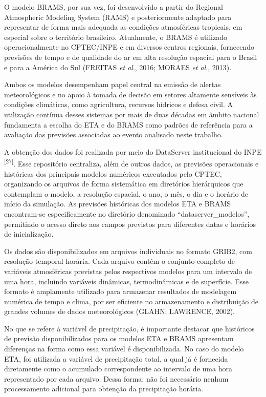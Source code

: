 \documentclass[12pt,a4paper,oneside]{book}
\begin{document}
O modelo BRAMS, por sua vez, foi desenvolvido a partir do Regional Atmospheric Modeling System (RAMS) e posteriormente adaptado para representar de forma mais adequada as condições atmosféricas tropicais, em especial sobre o território brasileiro. Atualmente, o BRAMS é utilizado operacionalmente no CPTEC/INPE e em diversos centros regionais, fornecendo previsões de tempo e de qualidade do ar em alta resolução espacial para o Brasil e para a América do Sul (FREITAS \emph{et al}., 2016; MORAES \emph{et al}., 2013).

Ambos os modelos desempenham papel central na emissão de alertas meteorológicos e no apoio à tomada de decisão em setores altamente sensíveis às condições climáticas, como agricultura, recursos hídricos e defesa civil. A utilização contínua desses sistemas por mais de duas décadas em âmbito nacional fundamenta a escolha do ETA e do BRAMS como padrões de referência para a avaliação das previsões associadas ao evento analisado neste trabalho.

A obtenção dos dados foi realizada por meio do DataServer institucional do INPE \textsuperscript{{[}27{]}}. Esse repositório centraliza, além de outros dados, as previsões operacionais e históricas dos principais modelos numéricos executados pelo CPTEC, organizando os arquivos de forma sistemática em diretórios hierárquicos que contemplam o modelo, a resolução espacial, o ano, o mês, o dia e o horário de início da simulação. As previsões históricas dos modelos ETA e BRAMS encontram-se especificamente no diretório denominado ``dataserver\_modelos'', permitindo o acesso direto aos campos previstos para diferentes datas e horários de inicialização.

Os dados são disponibilizados em arquivos individuais no formato GRIB2, com resolução temporal horária. Cada arquivo contém o conjunto completo de variáveis atmosféricas previstas pelos respectivos modelos para um intervalo de uma hora, incluindo variáveis dinâmicas, termodinâmicas e de superfície. Esse formato é amplamente utilizado para armazenar resultados de modelagem numérica de tempo e clima, por ser eficiente no armazenamento e distribuição de grandes volumes de dados meteorológicos (GLAHN; LAWRENCE, 2002).

No que se refere à variável de precipitação, é importante destacar que históricos de previsão disponibilizados para os modelos ETA e BRAMS apresentam diferenças na forma como essa variável é disponibilizada. No caso do modelo ETA, foi utilizada a variável de precipitação total, a qual já é fornecida diretamente como o acumulado correspondente ao intervalo de uma hora representado por cada arquivo. Dessa forma, não foi necessário nenhum processamento adicional para obtenção da precipitação horária.
\end{document}
